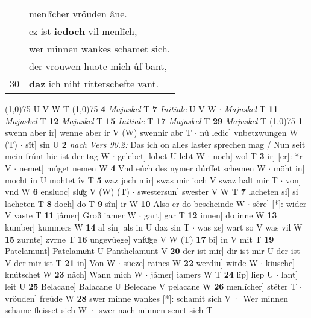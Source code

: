 \documentclass[8pt,a4paper,notitlepage]{article}
\begin{document}
\begin{table}[ht]
\begin{minipage}[t]{0.5\linewidth}
\begin{tabular}{rl}
 & menlîcher vröuden âne.\\ 
 & ez ist \textbf{iedoch} vil menlîch,\\ 
 & wer minnen wankes schamet sich.\\ 
 & der vrouwen huote mich ûf bant,\\ 
30 & \textbf{daz} ich niht ritterschefte vant.\\ 
\end{tabular}
\scriptsize
\line(1,0){75} \newline
U V W T \newline
\line(1,0){75} \newline
\textbf{4} \textit{Majuskel} T  \textbf{7} \textit{Initiale} U V W   $\cdot$ \textit{Majuskel} T  \textbf{11} \textit{Majuskel} T  \textbf{12} \textit{Majuskel} T  \textbf{15} \textit{Initiale} T  \textbf{17} \textit{Majuskel} T  \textbf{29} \textit{Majuskel} T  \newline
\line(1,0){75} \newline
\textbf{1} swenn aber ir] wenne aber ir V (W) swennir abr T  $\cdot$ nû ledic] vnbetzwungen W (T)  $\cdot$ sît] sin U \textbf{2} \textit{nach Vers 90.2:} Das ich on alles laster sprechen mag / Nun seit mein frúnt hie ist der tag W   $\cdot$ gelebet] lobet U lebt W  $\cdot$ noch] wol T \textbf{3} ir] [er]: *r V  $\cdot$ nemet] múget nemen W \textbf{4} Vnd eúch des nymer dúrffet schemen W  $\cdot$ möht in] mocht in U mohtet îv T \textbf{5} waz joch mir] swas mir ioch V swaz halt mir T  $\cdot$ von] vnd W \textbf{6} ensluoc] sluͦg V (W) (T)  $\cdot$ swestersun] swester V W T \textbf{7} lacheten si] si lacheten T \textbf{8} doch] do T \textbf{9} sîn] ir W \textbf{10} Also er do bescheinde W  $\cdot$ sêre] [*]: wider V vaste T \textbf{11} jâmer] Groß iamer W  $\cdot$ gart] gar T \textbf{12} innen] do inne W \textbf{13} kumber] kummers W \textbf{14} al sîn] als in U daz sin T  $\cdot$ was ze] wart so V was vil W \textbf{15} zurnte] zvrne T \textbf{16} ungevüege] vnfuͦge V W (T) \textbf{17} bî] in V mit T \textbf{19} Patelamunt] Patelamuͦnt U Panthelamunt V \textbf{20} der ist mir] dir ist mir U der ist V der mir ist T \textbf{21} in] Von W  $\cdot$ süeze] raines W \textbf{22} werdiu] wirde W  $\cdot$ kiusche] knútschet W \textbf{23} nâch] Wann mich W  $\cdot$ jâmer] iamers W T \textbf{24} lîp] liep U  $\cdot$ lant] leit U \textbf{25} Belacane] Balacane U Belecane V pelacane W \textbf{26} menlîcher] stêter T  $\cdot$ vröuden] freúde W \textbf{28} swer minne wankes [*]: schamit sich V · Wer minnen schame fleisset sich W · swer nach minnen senet sich T \newline
\end{minipage}
\end{table}
\end{document}
